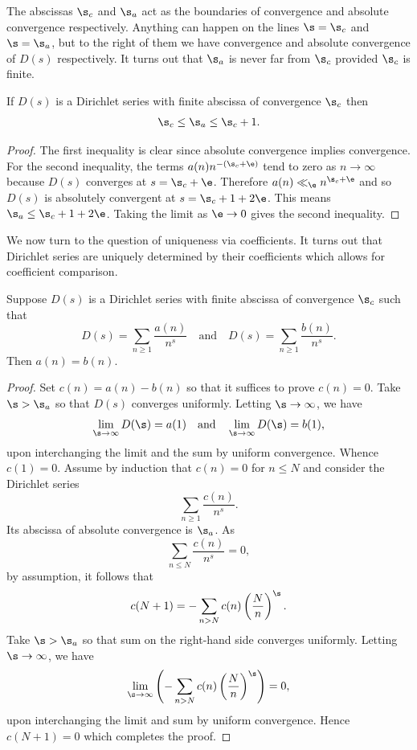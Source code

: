 \documentclass[12pt]{article}
\begin{document}
      The abscissas \(\s_{c}\) and \(\s_{a}\) act as the boundaries of convergence and absolute convergence respectively. Anything can happen on the lines \(\s = \s_{c}\) and \(\s = \s_{a}\), but to the right of them we have convergence and absolute convergence of \(D(s)\) respectively. It turns out that \(\s_{a}\) is never far from \(\s_{c}\) provided \(\s_{c}\) is finite.

      \begin{theorem}\label{thm:abscissa_of_absolute_convergence_bound}
        If \(D(s)\) is a Dirichlet series with finite abscissa of convergence \(\s_{c}\) then
        \[
          \s_{c} \le \s_{a} \le \s_{c}+1.
        \]
      \end{theorem}
      \begin{proof}
        The first inequality is clear since absolute convergence implies convergence. For the second inequality, the terms \(a(n)n^{-(\s_{c}+\e)}\) tend to zero as \(n \to \infty\) because \(D(s)\) converges at \(s = \s_{c}+\e\). Therefore \(a(n) \ll_{\e} n^{\s_{c}+\e}\) and so \(D(s)\) is absolutely convergent at \(s = \s_{c}+1+2\e\). This means \(\s_{a} \le \s_{c}+1+2\e\). Taking the limit as \(\e \to 0\) gives the second inequality.
      \end{proof}

      We now turn to the question of uniqueness via coefficients. It turns out that Dirichlet series are uniquely determined by their coefficients which allows for coefficient comparison.

      \begin{proposition}\label{prop:coefficients_of_Dirichlet_series_are_unique}
        Suppose \(D(s)\) is a Dirichlet series with finite abscissa of convergence \(\s_{c}\) such that
        \[
          D(s) = \sum_{n \ge 1}\frac{a(n)}{n^{s}} \quad \text{and} \quad D(s) = \sum_{n \ge 1}\frac{b(n)}{n^{s}}.
        \]
        Then \(a(n) = b(n)\).
      \end{proposition}
      \begin{proof}
        Set \(c(n) = a(n)-b(n)\) so that it suffices to prove \(c(n) = 0\). Take \(\s > \s_{a}\) so that \(D(s)\) converges uniformly. Letting \(\s \to \infty\), we have
        \[
          \lim_{\s \to \infty}D(\s) = a(1) \quad \text{and} \quad \lim_{\s \to \infty}D(\s) = b(1),
        \]
        upon interchanging the limit and the sum by uniform convergence. Whence \(c(1) = 0\). Assume by induction that \(c(n) = 0\) for \(n \le N\) and consider the Dirichlet series
        \[
          \sum_{n \ge 1}\frac{c(n)}{n^{s}}.
        \]
        Its abscissa of absolute convergence is \(\s_{a}\). As
        \[
          \sum_{n \le N}\frac{c(n)}{n^{s}} = 0,
        \]
        by assumption, it follows that
        \[
          c(N+1) = -\sum_{n > N}c(n)\left(\frac{N}{n}\right)^{\s}.
        \]
        Take \(\s > \s_{a}\) so that sum on the right-hand side converges uniformly. Letting \(\s \to \infty\), we have
        \[
          \lim_{\s \to \infty}\left(-\sum_{n > N}c(n)\left(\frac{N}{n}\right)^{\s}\right) = 0,
        \]
        upon interchanging the limit and sum by uniform convergence. Hence \(c(N+1) = 0\) which completes the proof.
      \end{proof}
\end{document}

